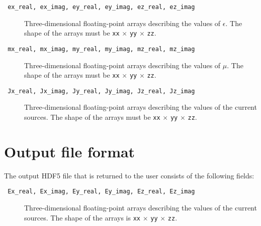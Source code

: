 \documentclass{article}
\newcommand{\I}[1]{\item[\texttt{ #1 }]}
\newcommand{\T}{\texttt}
\begin{document}
\begin{description}
\I  {ex\_real, ex\_imag, ey\_real, ey\_imag, ez\_real, ez\_imag}
    Three-dimensional floating-point arrays describing the values of $\epsilon$.
    The shape of the arrays must be \T{xx} $\times$ \T{yy} $\times$ \T{zz}.

\I  {mx\_real, mx\_imag, my\_real, my\_imag, mz\_real, mz\_imag}
    Three-dimensional floating-point arrays describing the values of $\mu$.
    The shape of the arrays must be \T{xx} $\times$ \T{yy} $\times$ \T{zz}.

\I  {Jx\_real, Jx\_imag, Jy\_real, Jy\_imag, Jz\_real, Jz\_imag}
    Three-dimensional floating-point arrays describing the values of the
        current sources.
    The shape of the arrays must be \T{xx} $\times$ \T{yy} $\times$ \T{zz}.
\end{description}

\section{Output file format}
The output HDF5 file that is returned to the user
    consists of the following fields:
\begin{description}
\I  {Ex\_real, Ex\_imag, Ey\_real, Ey\_imag, Ez\_real, Ez\_imag}
    Three-dimensional floating-point arrays describing the values of the
        current sources.
    The shape of the arrays is \T{xx} $\times$ \T{yy} $\times$ \T{zz}.
\end{description}
\end{document}
